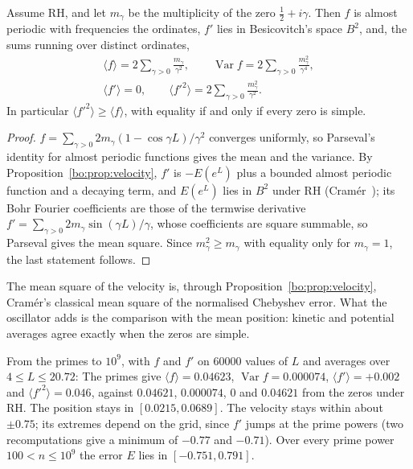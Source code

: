 \begin{proposition}\label{bo:prop:averages}
Assume RH, and let $m_\gamma$ be the multiplicity of the zero $\frac12+i\gamma$. Then $f$ is almost periodic with frequencies the ordinates, $f'$ lies in Besicovitch's space $B^2$, and, the sums running over distinct ordinates,
\begin{gather*}
\langle f\rangle=2\sum_{\gamma>0}\frac{m_\gamma}{\gamma^2},\qquad \operatorname{Var}f=2\sum_{\gamma>0}\frac{m_\gamma^2}{\gamma^4},\\
\langle f'\rangle=0,\qquad \langle f'^2\rangle=2\sum_{\gamma>0}\frac{m_\gamma^2}{\gamma^2}.
\end{gather*}
In particular $\langle f'^2\rangle\ge\langle f\rangle$, with equality if and only if every zero is simple.
\end{proposition}

\begin{proof}
$f=\sum_{\gamma>0}2m_\gamma(1-\cos\gamma L)/\gamma^2$ converges uniformly, so Parseval's identity for almost periodic functions gives the mean and the variance. By Proposition~\ref{bo:prop:velocity}, $f'$ is $-E(e^L)$ plus a bounded almost periodic function and a decaying term, and $E(e^L)$ lies in $B^2$ under RH (Cram\'er~\cite{Cramer}); its Bohr Fourier coefficients are those of the termwise derivative $f'=\sum_{\gamma>0}2m_\gamma\sin(\gamma L)/\gamma$, whose coefficients are square summable, so Parseval gives the mean square. Since $m_\gamma^2\ge m_\gamma$ with equality only for $m_\gamma=1$, the last statement follows.
\end{proof}

The mean square of the velocity is, through Proposition~\ref{bo:prop:velocity}, Cram\'er's classical mean square of the normalised Chebyshev error. What the oscillator adds is the comparison with the mean position: kinetic and potential averages agree exactly when the zeros are simple.

\begin{remark}[Computation]\label{bo:comp:oscdeep}
From the primes to $10^9$, with $f$ and $f'$ on $60000$ values of $L$ and averages over $4\le L\le20.72$:
The primes give $\langle f\rangle=0.04623$, $\operatorname{Var}f=0.000074$, $\langle f'\rangle=+0.002$ and $\langle f'^2\rangle=0.046$, against $0.04621$, $0.000074$, $0$ and $0.04621$ from the zeros under RH.
The position stays in $[0.0215,0.0689]$. The velocity stays within about $\pm0.75$; its extremes depend on the grid, since $f'$ jumps at the prime powers (two recomputations give a minimum of $-0.77$ and $-0.71$). Over every prime power $100<n\le10^9$ the error $E$ lies in $[-0.751,0.791]$. %
\end{remark}

